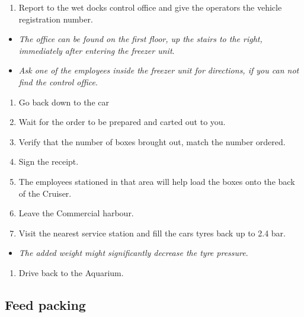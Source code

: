 \documentclass[
  letterpaper,
  DIV=11,
  numbers=noendperiod]{scrreprt}
\providecommand{\tightlist}{%
  \setlength{\itemsep}{0pt}\setlength{\parskip}{0pt}}\usepackage{longtable,booktabs,array}
\begin{document}
\begin{enumerate}
\def\labelenumi{\arabic{enumi}.}
\setcounter{enumi}{5}
\tightlist
\item
  Report to the wet docks control office and give the operators the
  vehicle registration number.
\end{enumerate}

\begin{itemize}
\tightlist
\item
  \emph{The office can be found on the first floor, up the stairs to the
  right, immediately after entering the freezer unit}.
\item
  \emph{Ask one of the employees inside the freezer unit for directions,
  if you can not find the control office}.
\end{itemize}

\begin{enumerate}
\def\labelenumi{\arabic{enumi}.}
\setcounter{enumi}{6}
\tightlist
\item
  Go back down to the car
\item
  Wait for the order to be prepared and carted out to you.
\item
  Verify that the number of boxes brought out, match the number ordered.
\item
  Sign the receipt.
\item
  The employees stationed in that area will help load the boxes onto the
  back of the Cruiser.
\item
  Leave the Commercial harbour.
\item
  Visit the nearest service station and fill the cars tyres back up to
  2.4 bar.
\end{enumerate}

\begin{itemize}
\tightlist
\item
  \emph{The added weight might significantly decrease the tyre
  pressure}.\\
\end{itemize}

\begin{enumerate}
\def\labelenumi{\arabic{enumi}.}
\setcounter{enumi}{13}
\tightlist
\item
  Drive back to the Aquarium.
\end{enumerate}

\hypertarget{feed-packing}{%
\subsection{Feed packing}\label{feed-packing}}
\end{document}

